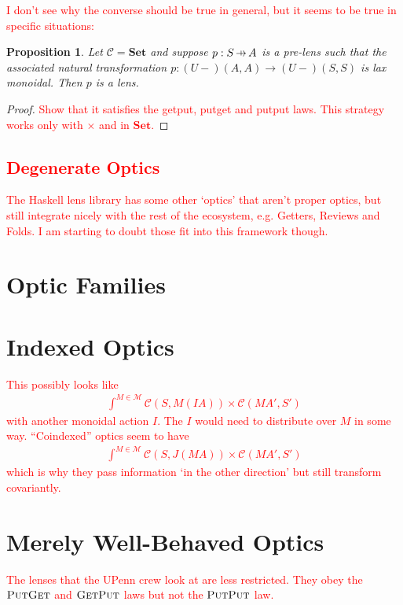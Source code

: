 \documentclass[11pt,a4paper]{article}
\theoremstyle{plain}
\newtheorem{proposition}[theorem]{Proposition}
\theoremstyle{definition}
\newcommand{\C}{\mathscr{C}}
\newcommand{\M}{\mathscr{M}}
\newcommand{\Set}{\mathbf{Set}}
\newcommand{\fget}{\textsc{Get}}
\newcommand{\fput}{\textsc{Put}}
\newcommand{\hto}{\ensuremath{\,\mathaccent\shortmid\rightarrow\,}}
\newcommand{\todo}[1]{\textcolor{red}{\small #1}}
\begin{document}
\todo{I don't see why the converse should be true in general, but it seems to be true in specific situations:}

\begin{proposition}
Let $\C = \Set$ and suppose $p : S \hto A$ is a pre-lens such that the associated natural transformation $p : (U-)(A,A) \to (U-)(S,S)$ is lax monoidal. Then $p$ is a lens.
\end{proposition}
\begin{proof}
\todo{Show that it satisfies the getput, putget and putput laws. This strategy works only with $\times$ and in $\Set$.}
\end{proof}

\todo{
\section{Degenerate Optics}
The Haskell lens library has some other `optics' that aren't proper optics, but still integrate nicely with the rest of the ecosystem, e.g. Getters, Reviews and Folds. I am starting to doubt those fit into this framework though.}

\section{Optic Families}


\section{Indexed Optics}
\todo{
This possibly looks like
\begin{align*}
\int^{M \in \M} \C(S, M(IA)) \times \C(M A', S')
\end{align*}
with another monoidal action $I$. The $I$ would need to distribute over $M$ in some way. ``Coindexed'' optics seem to have 
\begin{align*}
\int^{M \in \M} \C(S, J(MA)) \times \C(M A', S')
\end{align*}
which is why they pass information `in the other direction' but still transform covariantly.
}

\section{Merely Well-Behaved Optics}
\todo{
The lenses that the UPenn crew look at are less restricted. They obey the $\fput\fget$ and $\fget\fput$ laws but not the $\fput\fput$ law. 
}
\end{document}
